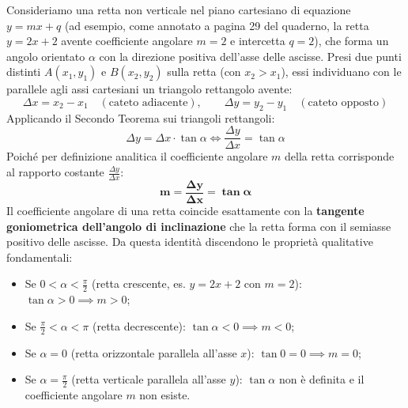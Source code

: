 \documentclass[11pt,a4paper,oneside]{report}
\begin{document}
Consideriamo una retta non verticale nel piano cartesiano di equazione $y = mx + q$ (ad esempio, come annotato a pagina 29 del quaderno, la retta $y = 2x + 2$ avente coefficiente angolare $m = 2$ e intercetta $q = 2$), che forma un angolo orientato $\alpha$ con la direzione positiva dell'asse delle ascisse.
Presi due punti distinti $A(x_1, y_1)$ e $B(x_2, y_2)$ sulla retta (con $x_2 > x_1$), essi individuano con le parallele agli assi cartesiani un triangolo rettangolo avente:
\begin{equation}
    \Delta x = x_2 - x_1 \quad (\text{cateto adiacente}), \qquad \Delta y = y_2 - y_1 \quad (\text{cateto opposto})
\end{equation}
Applicando il Secondo Teorema sui triangoli rettangoli:
\begin{equation}
    \Delta y = \Delta x \cdot \tan\alpha \iff \frac{\Delta y}{\Delta x} = \tan\alpha
\end{equation}
Poiché per definizione analitica il coefficiente angolare $m$ della retta corrisponde al rapporto costante $\frac{\Delta y}{\Delta x}$:
\begin{equation}
    \mathbf{m = \frac{\Delta y}{\Delta x} = \tan\alpha}
\end{equation}
Il coefficiente angolare di una retta coincide esattamente con la \textbf{tangente goniometrica dell'angolo di inclinazione} che la retta forma con il semiasse positivo delle ascisse. Da questa identità discendono le proprietà qualitative fondamentali:
\begin{itemize}[leftmargin=*, label=\textbullet]
    \item Se $0 < \alpha < \frac{\pi}{2}$ (retta crescente, es. $y = 2x + 2$ con $m = 2$): $\tan\alpha > 0 \implies m > 0$;
    \item Se $\frac{\pi}{2} < \alpha < \pi$ (retta decrescente): $\tan\alpha < 0 \implies m < 0$;
    \item Se $\alpha = 0$ (retta orizzontale parallela all'asse $x$): $\tan 0 = 0 \implies m = 0$;
    \item Se $\alpha = \frac{\pi}{2}$ (retta verticale parallela all'asse $y$): $\tan\alpha$ non è definita e il coefficiente angolare $m$ non esiste.
\end{itemize}
\end{document}
